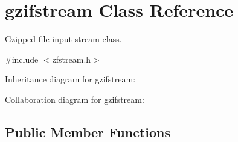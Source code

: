 \hypertarget{classgzifstream}{\section{gzifstream Class Reference}
\label{classgzifstream}
}


Gzipped file input stream class.  




{\ttfamily \#include $<$zfstream.\+h$>$}



Inheritance diagram for gzifstream\+:


Collaboration diagram for gzifstream\+:
\subsection*{Public Member Functions}
